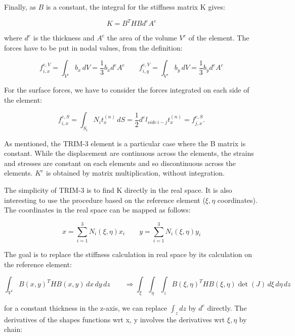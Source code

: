 	Finally, as $B$ is a constant, the integral for the stiffness matrix K gives:
	
	\begin{equation}
	K = B^T H B d^eA^e
	\end{equation}
	
	where $d^e$ is the thickness and $A^e$ the area of the volume $V^e$ of the element. The forces have to be put in nodal values, from the definition:
	
	\begin{equation}
	f^{e,V}_{i,x} = \int_{V^e} b_x \, dV = \frac{1}{3} b_x d^e A^e \qquad f^{e,V}_{i,y} = \int_{V^e} b_y \, dV = \frac{1}{3} b_y d^e A^e
	\end{equation}
	
	For the surface forces, we have to consider the forces integrated on each side of the element: 
	
	\begin{equation}
	f_{i,x}^{e,S} = \int _{S_t} N_i t_x^{(n)} \, dS = \frac{1}{2} d^e l_{side\, i-j} t_x^{(n)} = f_{j,x}^{e,S}.
	\end{equation}
	
	As mentioned, the TRIM-3 element is a particular case where the B matrix is constant. While the displacement are continuous across the elements, the strains and stresses are constant on each elements and so discontinuous across the elements. $K^e$ is obtained by matrix multiplication, without integration. 
	
	The simplicity of TRIM-3 is to find K directly in the real space. It is also interesting to use the procedure based on the reference element ($\xi, \eta$ coordinates). The coordinates in the real space can be mapped as follows: 
	
	\begin{equation}
	x = \sum _{i=1}^3 N_i (\xi, \eta) x_i\qquad y = \sum _{i=1}^3 N_i (\xi, \eta) y_i
	\end{equation}
	
	The goal is to replace the stiffness calculation in real space by its calculation on the reference element:
	
	\begin{equation}
	\int_{V^e} B(x,y)^T H B(x,y) \, dx\, dy \, dz \qquad \Rightarrow \int _{\xi} \int _\eta \int _z B(\xi,\eta)^T H B(\xi,\eta) \det (J) \, d\xi \, d\eta \, dz
	\end{equation}
	
	for a constant thickness in the z-axis, we can replace $\int_z dz$ by $d^e$ directly. The derivatives of the shapes functions wrt x, y involves the derivatives wrt $\xi, \eta$ by chain: 
	
